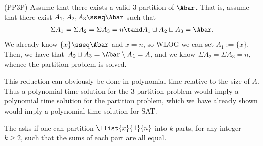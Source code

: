 \documentclass{article}
\begin{document}
\begin{solution}
\begin{subproof}[Correctness.]
    (PP\pmi 3P)
    Assume that there exists a valid 3-partition of $ \Abar $.
    That is, assume that there exist $ A_1, A_2, A_3 \sseq \Abar $ such that \begin{align*}
      \Sigma A_1 = \Sigma A_2 = \Sigma A_3 = n \tand A_1 \sqcup A_2 \sqcup A_3 = \Abar.
    \end{align*}
    We already know $ \{x\}\sseq \Abar $ and $ x=n $, so WLOG we can set $ A_1 := \{x\} $.
    Then, we have that $ A_2 \sqcup A_3 = \Abar \setminus A_1 = A $, and we know $ \Sigma A_2 = \Sigma A_3 = n $, whence the partition problem is solved.
  \end{subproof}
  This reduction can obviously be done in polynomial time relative to the size of $ A $.
  Thus a polynomial time solution for the 3-partition problem would imply a polynomial time solution for the partition problem, which we have already shown would imply a polynomial time solution for SAT.
\end{solution}
\pagebreak


\begin{subexercise}
  The  asks if one can partition $ \llist{x}{1}{n} $ into $ k $ parts, for any integer $ k \geq 2 $, such that the sums of each part are all equal.
\end{subexercise}
\end{document}
